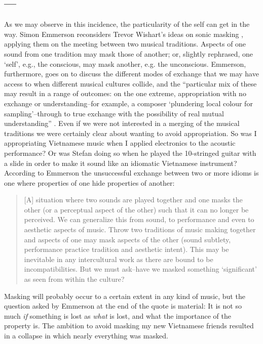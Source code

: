 \documentclass[a4paper]{article}
\begin{document}
\subsection*{---}

As we may observe in this incidence, the particularity of the self can get in the way. Simon Emmerson reconsiders Trevor Wishart's ideas on sonic masking \citep{wis96}, applying them on the meeting between two musical traditions. Aspects of one sound from one tradition may mask those of another; or, slightly rephrased, one `self', e.g., the conscious, may mask another, e.g. the unconscious. Emmerson, furthermore, goes on to discuss the different modes of exchange that we may have access to when different musical cultures collide, and the ``particular mix of these may result in a range of outcomes: on the one extreme, appropriation with no exchange or understanding--for example, a composer `plundering local colour for sampling'--through to true exchange with the possibility of real mutual understanding'' \citep{emmerson06}. Even if we were not interested in a merging of the musical traditions we were certainly clear about wanting to avoid appropriation. So was I appropriating Vietnamese music when I applied electronics to the acoustic performance? Or was Stefan doing so when he played the 10-stringed guitar with a slide in order to make it sound like an idiomatic Vietnamese instrument? According to Emmerson the unsuccessful exchange between two or more idioms is one where properties of one hide properties of another:

\begin{quote}
[A] situation where two sounds are played together and one masks the other (or a perceptual aspect of the other) such that it can no longer be perceived. We can generalize this from sound, to performance and even to aesthetic aspects of music. Throw two traditions of music making together and aspects of one may mask aspects of the other (sound subtlety, performance practice tradition and aesthetic intent). This may be inevitable in any intercultural work as there are bound to be incompatibilities. But we must ask--have we masked something ‘significant’ as seen from within the culture? \citep{emmerson06}
\end{quote}

Masking will probably occur to a certain extent in any kind of music, but the question asked by Emmerson at the end of the quote is material: It is not so much \emph{if} something is lost as \emph{what} is lost, and what the importance of the property is. The ambition to avoid masking my new Vietnamese friends resulted in a collapse in which nearly everything was masked.  
\end{document}
